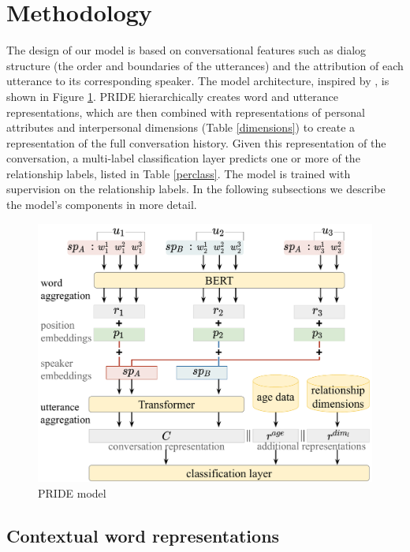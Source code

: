 \section{Methodology}

The design of our model is based on conversational features such as dialog structure (the order and boundaries of the utterances) and the attribution of each utterance to its corresponding speaker. The model architecture, inspired by \citet{li2020hierarchical}, is shown in Figure \ref{pipeline}. PRIDE hierarchically creates word and utterance representations, which are then combined with representations of personal attributes and interpersonal dimensions (Table \ref{dimensions}) to create a representation of the full conversation history.
Given this representation of the conversation, a multi-label classification layer predicts one or more of the relationship labels, listed in Table \ref{perclass}.
The model is trained with supervision on the relationship labels.
In the following subsections we describe the model's components in more detail.

\begin{figure}[t!]
\centering
\begin{adjustbox}{width=0.6\textwidth}
\includegraphics{imgs/PRIDE_scheme_3}
\end{adjustbox}
\caption{PRIDE model}
\label{pipeline}
\end{figure}

\subsection{Contextual word representations}

